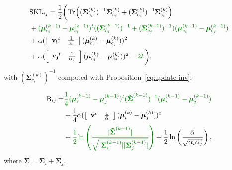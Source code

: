 \documentclass[journal,peerreview,onecolumn]{IEEEtran}
\begin{document}
        {\footnotesize
        \begin{align}
        \label{eq:skl-update}
            &\text{SKL}_{ij} = \frac{1}{2} \biggl( \text{Tr} \left((\boldsymbol{\Sigma}_{c_i}^{(k)})^{-1} \boldsymbol{\Sigma}_{c_j}^{(k)} + (\boldsymbol{\Sigma}_{c_j}^{(k)})^{-1} \boldsymbol{\Sigma}_{c_i}^{(k)}\right) \nonumber \\
            &+ \textcolor[rgb]{0,0.5,0}{(\boldsymbol{\mu}_{c_i}^{(k-1)} - \boldsymbol{\mu}_{c_j}^{(k-1)})^t ((\boldsymbol{\Sigma}_{c_i}^{(k-1)})^{-1} + (\boldsymbol{\Sigma}_{c_j}^{(k-1)})^{-1}) (\boldsymbol{\mu}_{c_i}^{(k-1)} - \boldsymbol{\mu}_{c_j}^{(k-1)})} \nonumber \\
            &+ \alpha ( \left[\begin{array}{cc} \mathbf{v_i}^t & \frac{1}{\alpha_i} \end{array}\right] (\boldsymbol{\mu}_{c_i}^{(k)} - \boldsymbol{\mu}_{c_j}^{(k)}) )^2 \nonumber \\
            &+ \alpha ( \left[\begin{array}{cc} \mathbf{v_j}^t & \frac{1}{\alpha_j} \end{array}\right] (\boldsymbol{\mu}_{c_i}^{(k)} - \boldsymbol{\mu}_{c_j}^{(k)}) )^2
            - \textcolor[rgb]{0,0.5,0}{2k} \biggr),
        \end{align}
        }
        with $(\boldsymbol{\Sigma}_{c_i}^{(k)})^{-1}$ computed with Proposition~\ref{eq:update-inv};

        \begin{align}
        \label{eq:jm-update}
            \text{B}_{ij} = &\textcolor[rgb]{0,0.5,0}{\frac{1}{4} (\boldsymbol{\mu}_i^{(k-1)} - \boldsymbol{\mu}_j^{(k-1)})^t ( \boldsymbol{\tilde{\Sigma}}^{(k-1)} )^{-1} (\boldsymbol{\mu}_i^{(k-1)} - \boldsymbol{\mu}_j^{(k-1)})} \nonumber \\
            &+ \frac{1}{4} \tilde{\alpha} ( \left[\begin{array}{cc} \mathbf{\tilde{v}}^t & \frac{1}{\tilde{\alpha}} \end{array}\right] (\boldsymbol{\mu}_{i}^{(k)} - \boldsymbol{\mu}_{j}^{(k)}) )^2 \nonumber \\
            &+ \textcolor[rgb]{0,0.5,0}{\frac{1}{2} \ln \left( \frac{|\boldsymbol{\tilde{\Sigma}}^{(k-1)}|}{\sqrt{|\boldsymbol{\Sigma}_i^{(k-1)}| |\boldsymbol{\Sigma}_j^{(k-1)}|}} \right)} + \frac{1}{2} \ln \left( \frac{\tilde{\alpha}}{\sqrt{\alpha_i \alpha_j}} \right),
        \end{align}
        where $\boldsymbol{\tilde{\Sigma}} = \boldsymbol{\Sigma}_i + \boldsymbol{\Sigma}_j$.
\end{document}
